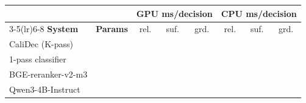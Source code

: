 \begin{tabular}{lccccccc}
\toprule
& & \multicolumn{3}{c}{\textbf{GPU ms/decision}} & \multicolumn{3}{c}{\textbf{CPU ms/decision}} \\
\cmidrule(lr){3-5}\cmidrule(lr){6-8}
\textbf{System} & \textbf{Params} & rel. & suf. & grd. & rel. & suf. & grd. \\
\midrule
CaliDec (K-pass) & \ph{--} & \ph{--} & \ph{--} & \ph{--} & \ph{--} & \ph{--} & \ph{--} \\
1-pass classifier & \ph{--} & \ph{--} & \ph{--} & \ph{--} & \ph{--} & \ph{--} & \ph{--} \\
BGE-reranker-v2-m3 & \ph{--} & \ph{--} & \ph{--} & \ph{--} & \ph{--} & \ph{--} & \ph{--} \\
Qwen3-4B-Instruct & \ph{--} & \ph{--} & \ph{--} & \ph{--} & \ph{--} & \ph{--} & \ph{--} \\
\bottomrule
\end{tabular}
